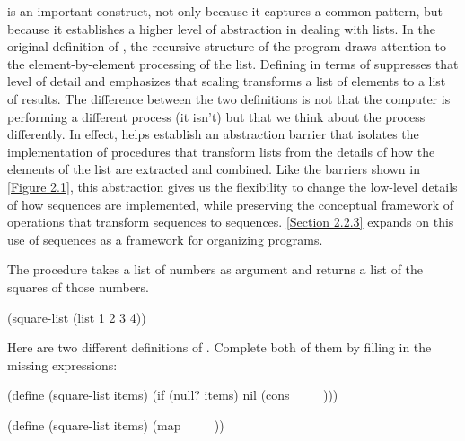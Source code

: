  is an important construct, not only because it captures a common pattern, but because it establishes a higher level of abstraction in dealing with lists.
In the original definition of , the recursive structure of the program draws attention to the element-by-element processing of the list.
Defining  in terms of  suppresses that level of detail and emphasizes that scaling transforms a list of elements to a list of results.
The difference between the two definitions is not that the computer is performing a different process (it isn’t) but that we think about the process differently.
In effect,  helps establish an abstraction barrier that isolates the implementation of procedures that transform lists from the details of how the elements of the list are extracted and combined.
Like the barriers shown in \cref{Figure 2.1}, this abstraction gives us the flexibility to change the low-level details of how sequences are implemented, while preserving the conceptual framework of operations that transform sequences to sequences.
\cref{Section 2.2.3} expands on this use of sequences as a framework for organizing programs.



\begin{exercise}
	\label{Exercise 2.21}
	The procedure  takes a list of numbers as argument and returns a list of the squares of those numbers.
	\begin{scheme}
	  (square-list (list 1 2 3 4))
	  ~~
	\end{scheme}
	Here are two different definitions of \code{square-list}.
	Complete both of them by filling in the missing expressions:
	\begin{scheme}
	  (define (square-list items)
	    (if (null? items)
	        nil
	        (cons ~~ ~~)))

	  (define (square-list items)
	    (map ~~ ~~))
	\end{scheme}
\end{exercise}




